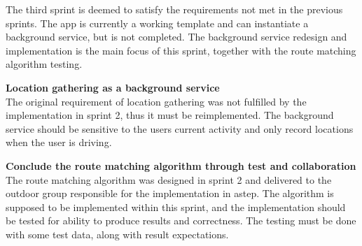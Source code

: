 The third sprint is deemed to satisfy the requirements not met in the previous sprints.
The app is currently a working template and can instantiate a background service, but is not completed. 
The background service redesign and implementation is the main focus of this sprint, together with the route matching algorithm testing.

\textbf{Location gathering as a background service}\\
The original requirement of location gathering was not fulfilled by the implementation in sprint 2, thus it must be reimplemented.
The background service should be sensitive to the users current activity and only record locations when the user is driving.

\textbf{Conclude the route matching algorithm through test and collaboration}\\
The route matching algorithm was designed in sprint 2 and delivered to the outdoor group responsible for the implementation in \gls{astep}.
The algorithm is supposed to be implemented within this sprint, and the implementation should be tested for ability to produce results and correctness.
The testing must be done with some test data, along with result expectations.


